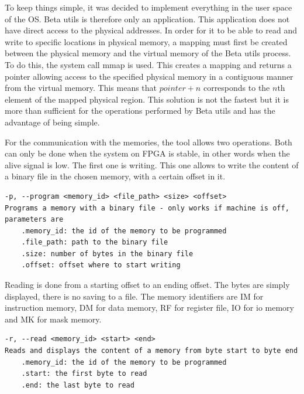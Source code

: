 To keep things simple, it was decided to implement everything in the user space of the OS. Beta 
utils is therefore only an application. This application does not have direct access to the 
physical addresses. In order for it to be able to read and write to specific locations in physical 
memory, a mapping must first be created between the physical memory and the virtual memory of the 
Beta utils process. To do this, the system call mmap is used. This creates a mapping and returns a 
pointer allowing access to the specified physical memory in a contiguous manner from the virtual 
memory. This means that $pointer + n$ corresponds to the $n$th element of the mapped physical region. 
This solution is not the fastest but it is more than sufficient for the operations performed by Beta 
utils and has the advantage of being simple. 

For the communication with the memories, the tool allows two operations. Both can only be done 
when the system on FPGA is stable, in other words when the alive signal is low. The first one is 
writing. This one allows to write the content of a binary file in the chosen memory, with a certain 
offset in it. 

{\small
\begin{lstlisting}[caption=Program command.]
-p, --program <memory_id> <file_path> <size> <offset>
Programs a memory with a binary file - only works if machine is off, 
parameters are
    .memory_id: the id of the memory to be programmed
    .file_path: path to the binary file
    .size: number of bytes in the binary file
    .offset: offset where to start writing
\end{lstlisting}}

Reading is done from a starting 
offset to an ending offset. The bytes are simply displayed, there is no saving to a file. 
The memory identifiers are IM for 
instruction memory, DM for data memory, RF for register file, IO for io memory and MK for mask 
memory.


{\small
\begin{lstlisting}[caption=Read command.]
-r, --read <memory_id> <start> <end>
Reads and displays the content of a memory from byte start to byte end
    .memory_id: the id of the memory to be programmed
    .start: the first byte to read
    .end: the last byte to read
\end{lstlisting}}


